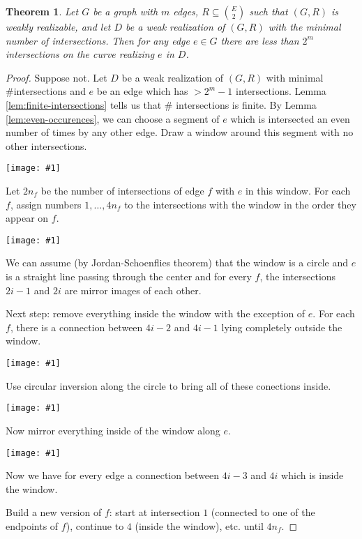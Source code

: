\documentclass[12pt]{article}
\theoremstyle{plain} %
\newtheorem{theorem}{Theorem}
\newcommand{\image}[1]{\begin{center}\texttt{[image: \#1]}\end{center}}
\begin{document}
\begin{theorem}\label{thm:weak-realizability-bound}
    Let \(G\) be a graph with \(m\) edges, \(R \subseteq \binom{E}{2}\) such that \((G, R)\) is weakly realizable, and let \(D\) 
    be a weak realization of \((G, R)\) with the minimal number of intersections. Then for any edge \(e \in G\) 
    there are less than \(2^m\) intersections on the curve realizing \(e\) in \(D\).
\end{theorem}

\begin{proof}
Suppose not. Let \(D\) be a weak realization of \((G, R)\) with minimal \#intersections and \(e\) 
be an edge which has \(> 2^m - 1\) intersections. Lemma \ref{lem:finite-intersections} tells us that \# intersections is finite.
By Lemma \ref{lem:even-occurences}, we can choose a segment of \(e\) which is intersected an even number of times by any other edge.
Draw a window around this segment with no other intersections. 

\image{images/figure-4.pdf}

Let \(2n_f\) be the number of intersections of edge \(f\) with \(e\) in this window.
For each \(f\), assign numbers \(1, \ldots, 4 n_f\) to the intersections with the window in the 
order they appear on \(f\). 

\image{images/figure-5.pdf}

We can assume (by Jordan-Schoenflies theorem) that the window is a circle and \(e\) is a straight line passing through the center
and for every \(f\), the intersections \(2i-1\) and \(2i\) are mirror images of each other.

Next step: remove everything inside the window with the exception of \(e\). For each \(f\), there is a connection between 
\(4i-2\) and \(4i-1\) lying completely outside the window. 

\image{images/figure-6.pdf}

Use circular inversion along the circle to bring all of these conections inside.

\image{images/figure-7.pdf}

Now mirror everything inside of the window along \(e\).

\image{images/figure-8.pdf}

Now we have for every edge a connection between \(4i-3\) and \(4i\) which is inside the window.

Build a new version of \(f\): start at intersection \(1\) (connected to one of the endpoints of \(f\)),
continue to \(4\) (inside the window), etc. until \(4 n_f\).


\end{proof}
\end{document}
